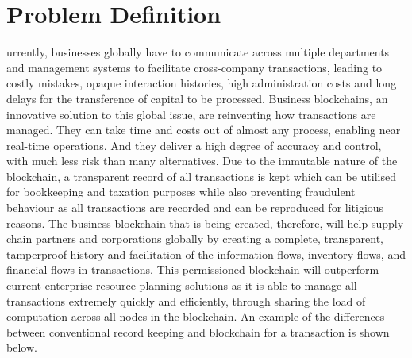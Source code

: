 %
%
%

\chapter*{Problem Definition}
urrently, businesses globally have to communicate across multiple departments and management systems to facilitate cross-company transactions, leading to costly mistakes, opaque interaction histories, high administration costs and long delays for the transference of capital to be processed. Business blockchains, an innovative solution to this global issue, are reinventing how transactions are managed. They can take time and costs out of almost any process, enabling near real-time operations. And they deliver a high degree of accuracy and control, with much less risk than many alternatives. Due to the immutable nature of the blockchain, a transparent record of all transactions is kept which can be utilised for bookkeeping and taxation purposes while also preventing fraudulent behaviour as all transactions are recorded and can be reproduced for litigious reasons. The business blockchain that is being created, therefore, will help supply chain partners and corporations globally by creating a complete, transparent, tamperproof history and facilitation of the information flows, inventory flows, and financial flows in transactions. This permissioned blockchain will outperform current enterprise resource planning solutions as it is able to manage all transactions extremely quickly and efficiently, through sharing the load of computation across all nodes in the blockchain. An example of the differences between conventional record keeping and blockchain for a transaction is shown below. \\

